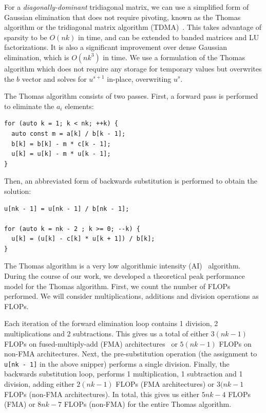 \documentclass{sig-alternate-05-2015}
\begin{document}
For a \emph{diagonally-dominant} tridiagonal matrix, we can use a simplified
  form of Gaussian elimination that does not require pivoting, known as the
  Thomas algorithm or the tridiagonal matrix algorithm
  (TDMA)~\cite{ConteEtAlElementaryNumericalAnalysis,QuarteroniEtAl2007,TDMA}. 
This takes advantage of sparsity to be \(O(nk)\) in time, 
  and can be extended to banded matrices and LU factorizations.
It is also a significant improvement over dense Gaussian elimination,
  which is \(O(nk^3)\) in time. 
We use a formulation of the Thomas algorithm which does not require any storage
  for temporary values but overwrites the \(b\) vector and solves for \(u^{s+1}\)
  in-place, overwriting \(u^{s}\).

The Thomas algorithm consists of two passes.  First, a forward pass is
  performed to eliminate the \(a_i\) elements:
\begin{lstlisting}
for (auto k = 1; k < nk; ++k) {
  auto const m = a[k] / b[k - 1];
  b[k] = b[k] - m * c[k - 1];
  u[k] = u[k] - m * u[k - 1];
} 
\end{lstlisting}
Then, an abbreviated form of backwards substitution is performed to obtain the
  solution:
\begin{lstlisting}
u[nk - 1] = u[nk - 1] / b[nk - 1];

for (auto k = nk - 2 ; k >= 0; --k) {
  u[k] = (u[k] - c[k] * u[k + 1]) / b[k];
} 
\end{lstlisting}

The Thomas algorithm is a very low algorithmic intensity (AI)~\cite{roofline}
  algorithm.
During the course of our work, we developed a theoretical peak performance
  model for the Thomas algorithm.
First, we count the number of FLOPs performed.
We will consider multiplications, additions and division operations as FLOPs.

Each iteration of the forward elimination loop contains 1 division, 2
  multiplications and 2 subtractions.
This gives us a total of either \(3(nk-1)\) FLOPs on fused-multiply-add (FMA)
  architectures~\cite{} or \(5(nk-1)\) FLOPs on non-FMA architectures.
Next, the pre-substitution operation (the assignment to \lstinline{u[nk - 1]}
  in the above snipper) performs a single division.
Finally, the backwards substitution loop, performs 1 multiplication, 1
  subtraction and 1 division, adding either \(2(nk-1)\) FLOPs (FMA architectures)
  or \(3(nk-1\) FLOPs (non-FMA architectures).
In total, this gives us either \(5nk-4\) FLOPs (FMA) or \(8nk-7\) FLOPs
  (non-FMA) for the entire Thomas algorithm.
\end{document}
